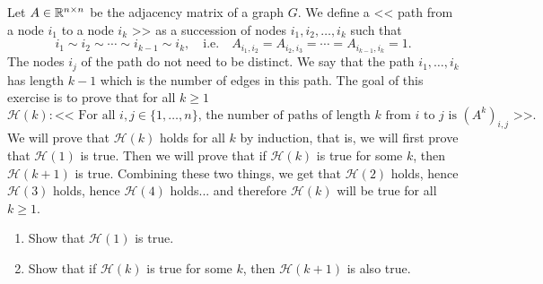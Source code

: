 \documentclass[11pt,nocut]{article}
\begin{document}
\begin{problem}[2 points]
	Let $A \in \mathbb{R}^{n\times n}$ be the adjacency matrix of a graph $G$.
	We define a << path from a node $i_1$ to a node $i_k$ >> as a succession of nodes $i_1,i_2, \dots, i_{k}$ such that 
	$$
	i_1 \sim i_2 \sim \cdots \sim i_{k-1} \sim i_k,
	\quad \text{i.e.} \quad
	A_{i_1,i_2} = A_{i_2, i_3} = \cdots = A_{i_{k-1},i_k} = 1.
	$$
	The nodes $i_j$ of the path do not need to be distinct. We say that the path $i_1, \dots, i_k$ has length $k-1$ which is the number of edges in this path.
	The goal of this exercise is to prove that for all $k \geq 1$
	$$
	\mathcal{H}(k): \text{<< For all $i,j \in \{1,\dots,n\}$, the number of paths of length $k$ from $i$ to $j$ is $(A^k)_{i,j}$ >>.} 
	$$
	We will prove that $\mathcal{H}(k)$ holds for all $k$ by induction, that is, we will first prove that $\mathcal{H}(1)$ is true. Then we will prove that if $\mathcal{H}(k)$ is true for some $k$, then $\mathcal{H}(k+1)$ is true. Combining these two things, we get that $\mathcal{H}(2)$ holds, hence $\mathcal{H}(3)$ holds, hence $\mathcal{H}(4)$ holds... and therefore $\mathcal{H}(k)$ will be true for all $k \geq 1$.
	
	\begin{enumerate}[label=\normalfont(\textbf{\alph*})]
		\item Show that $\mathcal{H}(1)$ is true.
		\item Show that if $\mathcal{H}(k)$ is true for some $k$, then $\mathcal{H}(k+1)$ is also true.
	\end{enumerate}


\end{problem}

\vspace{1mm}
\end{document}
